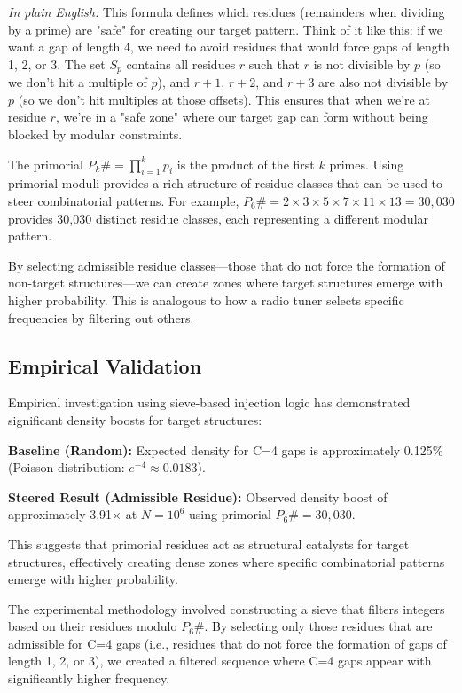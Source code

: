 \documentclass[12pt]{article}
\begin{document}
\textit{In plain English:} This formula defines which residues (remainders when dividing by a prime) are "safe" for creating our target pattern. Think of it like this: if we want a gap of length 4, we need to avoid residues that would force gaps of length 1, 2, or 3. The set $S_p$ contains all residues $r$ such that $r$ is not divisible by $p$ (so we don't hit a multiple of $p$), and $r+1$, $r+2$, and $r+3$ are also not divisible by $p$ (so we don't hit multiples at those offsets). This ensures that when we're at residue $r$, we're in a "safe zone" where our target gap can form without being blocked by modular constraints.

The primorial $P_k\# = \prod_{i=1}^k p_i$ is the product of the first $k$ primes. Using primorial moduli provides a rich structure of residue classes that can be used to steer combinatorial patterns. For example, $P_6\# = 2 \times 3 \times 5 \times 7 \times 11 \times 13 = 30,030$ provides 30,030 distinct residue classes, each representing a different modular pattern.

By selecting admissible residue classes—those that do not force the formation of non-target structures—we can create zones where target structures emerge with higher probability. This is analogous to how a radio tuner selects specific frequencies by filtering out others.

\subsection{Empirical Validation}
Empirical investigation using sieve-based injection logic has demonstrated significant density boosts for target structures:

\textbf{Baseline (Random):} Expected density for C=4 gaps is approximately 0.125\% (Poisson distribution: $e^{-4} \approx 0.0183$).

\textbf{Steered Result (Admissible Residue):} Observed density boost of approximately 3.91× at $N = 10^6$ using primorial $P_6\# = 30,030$.

This suggests that primorial residues act as structural catalysts for target structures, effectively creating dense zones where specific combinatorial patterns emerge with higher probability.

The experimental methodology involved constructing a sieve that filters integers based on their residues modulo $P_6\#$. By selecting only those residues that are admissible for C=4 gaps (i.e., residues that do not force the formation of gaps of length 1, 2, or 3), we created a filtered sequence where C=4 gaps appear with significantly higher frequency.
\end{document}
